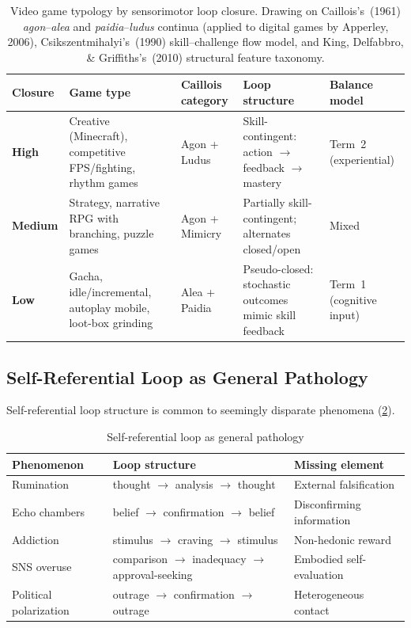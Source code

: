 \documentclass[a4paper,11pt,titlepage]{article}
\begin{document}
\begin{table}[htbp]
\centering
\caption{Video game typology by sensorimotor loop closure. Drawing on Caillois's~(1961) \emph{agon}--\emph{alea} and \emph{paidia}--\emph{ludus} continua (applied to digital games by Apperley, 2006), Csikszentmihalyi's~(1990) skill--challenge flow model, and King, Delfabbro, \& Griffiths's~(2010) structural feature taxonomy.}
\label{tab:game_typology}
\begin{tabular}{p{2cm}p{3.5cm}p{2.5cm}p{2.5cm}p{2.5cm}}
\toprule
\textbf{Closure} & \textbf{Game type} & \textbf{Caillois category} & \textbf{Loop structure} & \textbf{Balance model} \\
\midrule
\textbf{High} & Creative (Minecraft), competitive FPS/fighting, rhythm games & Agon + Ludus & Skill-contingent: action $\to$ feedback $\to$ mastery & Term~2 (experiential) \\
\addlinespace
\textbf{Medium} & Strategy, narrative RPG with branching, puzzle games & Agon + Mimicry & Partially skill-contingent; alternates closed/open & Mixed \\
\addlinespace
\textbf{Low} & Gacha, idle/incremental, autoplay mobile, loot-box grinding & Alea + Paidia & Pseudo-closed: stochastic outcomes mimic skill feedback & Term~1 (cognitive input) \\
\bottomrule
\end{tabular}
\end{table}


\subsection{Self-Referential Loop as General Pathology}\label{sec:self-ref}

Self-referential loop structure is common to seemingly disparate phenomena (\cref{tab:self-ref}).

\begin{table}[htbp]
\centering
\caption{Self-referential loop as general pathology}
\label{tab:self-ref}
\small
\begin{tabular}{p{3.2cm}p{5cm}p{4.5cm}}
\toprule
Phenomenon & Loop structure & Missing element \\
\midrule
Rumination & thought $\to$ analysis $\to$ thought & External falsification \\[3pt]
Echo chambers & belief $\to$ confirmation $\to$ belief & Disconfirming information \\[3pt]
Addiction & stimulus $\to$ craving $\to$ stimulus & Non-hedonic reward \\[3pt]
SNS overuse & comparison $\to$ inadequacy $\to$ approval-seeking & Embodied self-evaluation \\[3pt]
Political polarization & outrage $\to$ confirmation $\to$ outrage & Heterogeneous contact \\
\bottomrule
\end{tabular}
\end{table}
\end{document}
